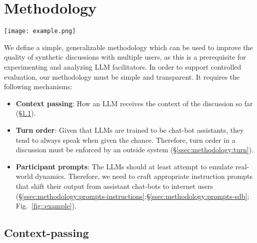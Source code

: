 %

\section{Methodology}
\label{sec:methodology}

\begin{figure*}[t]
	\centering
	\texttt{[image: example.png]}
	\caption{Excerpt from a synthetic discussion. The LLM participants use their sociodemographic prompts to insert personal stories and justify their perspectives in the discussion. They are also able to learn and retain information about other agents through conversation (a behavior also observed in \citet{park2023game}). User \texttt{CynicalInvestor88} is also a part of the discussion; not a hallucination. Comments clipped due to length.}
	\label{fig::example}
\end{figure*}

We define a simple, generalizable methodology which can be used to improve the quality of synthetic discussions with multiple users, as this is a prerequisite for experimenting and analyzing LLM facilitators. In order to support controlled evaluation, our methodology must be simple and transparent. It requires the following mechanisms:

\begin{itemize}[nosep, noitemsep]
	\item \textbf{Context passing}: How an LLM receives the context of the discussion so far (\S\ref{ssec:methodology:context}).  
	
	\item \textbf{Turn order}: Given that LLMs are trained to be chat-bot assistants, they tend to always speak when given the chance. Therefore, turn order in a discussion must be enforced by an outside system (\S\ref{ssec:methodology:turn}).
	
	\item \textbf{Participant prompts}: The LLMs should at least attempt to emulate real-world dynamics. Therefore, we need to craft appropriate instruction prompts that shift their output from assistant chat-bots to internet users (\S\ref{ssec:methodology:prompts-instructions};\S\ref{ssec:methodology:prompts-sdb}; Fig.~\ref{fig::example}).
	
\end{itemize}

\subsection{Context-passing}
\label{ssec:methodology:context}


